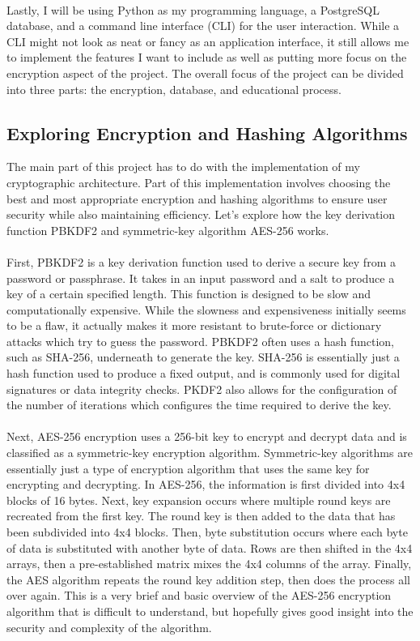 \documentclass[10pt,twocolumn]{article}
\begin{document}
\paragraph{}
Lastly, I will be using Python as my programming language, a PostgreSQL database, and a command line interface (CLI) for the user interaction. While a CLI might not look as neat or fancy as an application interface, it still allows me to implement the features I want to include as well as putting more focus on the encryption aspect of the project. The overall focus of the project can be divided into three parts: the encryption, database, and educational process.
\subsection{Exploring Encryption and Hashing Algorithms}
The main part of this project has to do with the implementation of my cryptographic architecture. Part of this implementation involves choosing the best and most appropriate encryption and hashing algorithms to ensure user security while also maintaining efficiency. Let's explore how the key derivation function PBKDF2 and symmetric-key algorithm AES-256 works.
\paragraph{}
First, PBKDF2 is a key derivation function used to derive a secure key from a password or passphrase. It takes in an input password and a salt to produce a key of a certain specified length. This function is designed to be slow and computationally expensive. While the slowness and expensiveness initially seems to be a flaw, it actually makes it more resistant to brute-force or dictionary attacks which try to guess the password. PBKDF2 often uses a hash function, such as SHA-256, underneath to generate the key. SHA-256 is essentially just a hash function used to produce a fixed output, and is commonly used for digital signatures or data integrity checks. PKDF2 also allows for the configuration of the number of iterations which configures the time required to derive the key.
\paragraph{}
Next, AES-256 encryption uses a 256-bit key to encrypt and decrypt data and is classified as a symmetric-key encryption algorithm. Symmetric-key algorithms are essentially just a type of encryption algorithm that uses the same key for encrypting and decrypting. In AES-256, the information is first divided into 4x4 blocks of 16 bytes. Next, key expansion occurs where multiple round keys are recreated from the first key. The round key is then added to the data that has been subdivided into 4x4 blocks. Then, byte substitution occurs where each byte of data is substituted with another byte of data. Rows are then shifted in the 4x4 arrays, then a pre-established matrix mixes the 4x4 columns of the array. Finally, the AES algorithm repeats the round key addition step, then does the process all over again. This is a very brief and basic overview of the AES-256 encryption algorithm that is difficult to understand, but hopefully gives good insight into the security and complexity of the algorithm.
\end{document}
